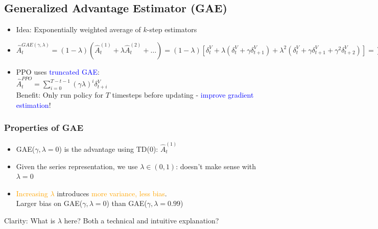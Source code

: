 \documentclass{article}
\begin{document}
\subsection{Generalized Advantage Estimator (GAE)}
\begin{itemize}
\item Idea: Exponentially weighted average of $k$-step estimators
\item $\hat{A}_t^{GAE(\gamma, \lambda)} = (1 - \lambda)(\hat{A}_t^{(1)} + \lambda \hat{A}_t^{(2)} + \dots) 
    = (1 - \lambda) \left[ \delta_{t}^{V} + \lambda(\delta_{t}^{V} + \gamma \delta_{t+1}^{V}) + \lambda^2(\delta_{t}^{V} + \gamma \delta_{t+1}^{V} + \gamma^2 \delta_{t+2}^{V}) \right]
    = \sum_{i = 0}^{\infty} (\gamma \lambda)^{i} \delta_{t + i}^{V}
    $ 
\item PPO uses \textcolor{blue}{truncated GAE}:
    \\$\hat{A}_t^{PPO} = \sum_{i = 0}^{T - t - 1} (\gamma \lambda)^{i} \delta_{t + i}^{V}$
    \\Benefit: Only run policy for $T$ timesteps before updating - \textcolor{blue}{improve gradient estimation}!
\end{itemize}

\begin{thmbox}
    \subsubsection*{Properties of GAE}
    \begin{itemize}
    \item GAE($\gamma, \lambda = 0$) is the advantage using TD(0): $\hat{A}_{t}^{(1)}$
    \item Given the series representation, we use $\lambda \in (0, 1)$: doesn't make sense with $\lambda = 0$
    \item \textcolor{orange}{Increasing $\lambda$} introduces \textcolor{orange}{more variance, less bias}. 
        \\Larger bias on GAE($\gamma, \lambda = 0$) than GAE($\gamma, \lambda = 0.99$)
    \end{itemize}
\end{thmbox}

\begin{hintbox}
    Clarity: What is $\lambda$ here? Both a technical and intuitive explanation?
\end{hintbox}
\end{document}
